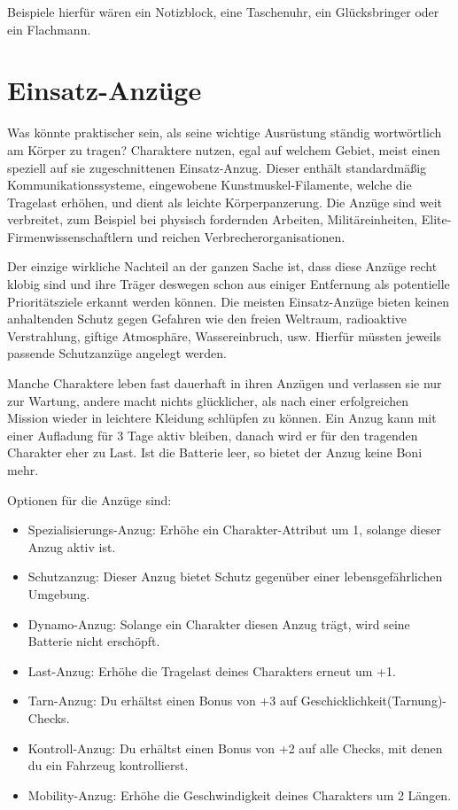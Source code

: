 Beispiele hierfür wären ein Notizblock, eine Taschenuhr, ein Glücksbringer oder ein Flachmann.
\section{Einsatz-Anzüge}
Was könnte praktischer sein, als seine wichtige Ausrüstung ständig wortwörtlich am Körper zu tragen? Charaktere nutzen, egal auf welchem Gebiet, meist einen speziell auf sie zugeschnittenen Einsatz-Anzug. Dieser enthält standardmäßig Kommunikationssysteme, eingewobene Kunstmuskel-Filamente, welche die Tragelast erhöhen, und dient als leichte Körperpanzerung. Die Anzüge sind weit verbreitet, zum Beispiel bei physisch fordernden Arbeiten, Militäreinheiten, Elite-Firmenwissenschaftlern und reichen Verbrecherorganisationen.

Der einzige wirkliche Nachteil an der ganzen Sache ist, dass diese Anzüge recht klobig sind und ihre Träger deswegen schon aus einiger Entfernung als potentielle Prioritätsziele erkannt werden können. Die meisten Einsatz-Anzüge bieten keinen anhaltenden Schutz gegen Gefahren wie den freien Weltraum, radioaktive Verstrahlung, giftige Atmosphäre, Wassereinbruch, usw. Hierfür müssten jeweils passende Schutzanzüge angelegt werden.

Manche Charaktere leben fast dauerhaft in ihren Anzügen und verlassen sie nur zur Wartung, andere macht nichts glücklicher, als nach einer erfolgreichen Mission wieder in \glqq leichtere\grqq{} Kleidung schlüpfen zu können. Ein Anzug kann mit einer Aufladung für 3 Tage aktiv bleiben, danach wird er für den tragenden Charakter eher zu Last. Ist die Batterie leer, so bietet der Anzug keine Boni mehr.

Optionen für die Anzüge sind:
\begin{itemize}
\itemsep0pt
\item Spezialisierungs-Anzug: Erhöhe ein Charakter-Attribut um 1, solange dieser Anzug aktiv ist.
\item Schutzanzug: Dieser Anzug bietet Schutz gegenüber einer lebensgefährlichen Umgebung.
\item Dynamo-Anzug: Solange ein Charakter diesen Anzug trägt, wird seine Batterie nicht erschöpft.
\item Last-Anzug: Erhöhe die Tragelast deines Charakters erneut um +1.
\item Tarn-Anzug: Du erhältst einen Bonus von +3 auf Geschicklichkeit(Tarnung)-Checks.
\item Kontroll-Anzug: Du erhältst einen Bonus von +2 auf alle Checks, mit denen du ein Fahrzeug kontrollierst.
\item Mobility-Anzug: Erhöhe die Geschwindigkeit deines Charakters um 2 Längen.
\end{itemize}

